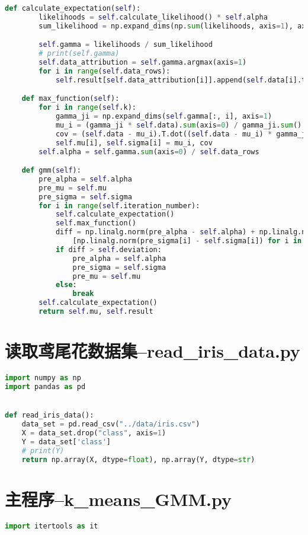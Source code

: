 \documentclass{hitreport}
\begin{document}
\begin{appendices}
\begin{lstlisting}[language=python]
    def calculate_expectation(self):
        likelihoods = self.calculate_likelihood() * self.alpha
        sum_likelihood = np.expand_dims(np.sum(likelihoods, axis=1), axis=1)

        self.gamma = likelihoods / sum_likelihood
        # print(self.gamma)
        self.data_attribution = self.gamma.argmax(axis=1)
        for i in range(self.data_rows):
            self.result[self.data_attribution[i]].append(self.data[i].tolist())

    def max_function(self):
        for i in range(self.k):
            gamma_ji = np.expand_dims(self.gamma[:, i], axis=1)
            mu_i = (gamma_ji * self.data).sum(axis=0) / gamma_ji.sum()
            cov = (self.data - mu_i).T.dot((self.data - mu_i) * gamma_ji) / gamma_ji.sum()
            self.mu[i], self.sigma[i] = mu_i, cov
        self.alpha = self.gamma.sum(axis=0) / self.data_rows

    def gmm(self):
        pre_alpha = self.alpha
        pre_mu = self.mu
        pre_sigma = self.sigma
        for i in range(self.iteration_number):
            self.calculate_expectation()
            self.max_function()
            diff = np.linalg.norm(pre_alpha - self.alpha) + np.linalg.norm(pre_mu - self.mu) + np.sum(
                [np.linalg.norm(pre_sigma[i] - self.sigma[i]) for i in range(self.k)])
            if diff > self.deviation:
                pre_alpha = self.alpha
                pre_sigma = self.sigma
                pre_mu = self.mu
            else:
                break
        self.calculate_expectation()
        return self.mu, self.result

\end{lstlisting}

\section{读取鸢尾花数据集--read\_iris\_data.py}\label{app:data}
\begin{lstlisting}[language=python]
import numpy as np
import pandas as pd


def read_iris_data():
    data_set = pd.read_csv("../data/iris.csv")
    X = data_set.drop("class", axis=1)
    Y = data_set['class']
    # print(Y)
    return np.array(X, dtype=float), np.array(Y, dtype=str)

\end{lstlisting}

\section{主程序--k\_means\_GMM.py}\label{app:main}
\begin{lstlisting}[language=python]
import itertools as it


\end{lstlisting}
\end{appendices}
\end{document}
